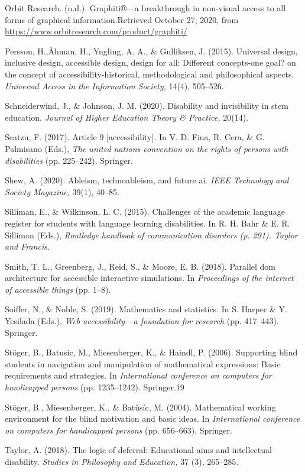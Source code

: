 \documentclass{sig-alternate} %
\begin{document}
Orbit Research. (n.d.). Graphiti®—a breakthrough in non-visual access to all forms of graphical information.Retrieved October 27, 2020, from \url{https://www.orbitresearch.com/product/graphiti/}

Persson, H.,Åhman, H., Yngling, A. A., \& Gulliksen, J. (2015). Universal design, inclusive design, accessible design, design for all: Different concepts-one goal? on the concept of accessibility-historical, methodological and philosophical aspects. \textit{Universal Access in the Information Society,} 14(4), 505–526.

Schneiderwind, J., \& Johnson, J. M. (2020). Disability and invisibility in stem education. \textit{Journal of Higher Education Theory \& Practice,} 20(14).

Seatzu, F. (2017). Article 9 [accessibility]. In V. D. Fina, R. Cera, \& G. Palmisano (Eds.), \textit{The united nations convention on the rights of persons with disabilities} (pp. 225–242). Springer.

Shew, A. (2020). Ableism, technoableism, and future ai. \textit{IEEE Technology and Society Magazine,} 39(1), 40–85.

Silliman, E., \& Wilkinson, L. C. (2015). Challenges of the academic language register for students with language learning disabilities. In R. H. Bahr \& E. R. Silliman (Eds.), \textit{Routledge handbook of communication disorders (p. 291). Taylor and Francis.}

Smith, T. L., Greenberg, J., Reid, S., \& Moore, E. B. (2018). Parallel dom architecture for accessible interactive simulations. In \textit{Proceedings of the internet of accessible things} (pp. 1–8).

Soiffer, N., \& Noble, S. (2019). Mathematics and statistics. In S. Harper \& Y. Yesilada (Eds.), \textit{Web accessibility—a foundation for research} (pp. 417–443). Springer.

Stöger, B., Batusic, M., Miesenberger, K., \& Haindl, P. (2006). Supporting blind students in navigation and manipulation of mathematical expressions: Basic requirements and strategies. In \textit{International conference on computers for handicapped persons} (pp. 1235–1242). Springer.19

Stöger, B., Miesenberger, K., \& Batǔsíc, M. (2004). Mathematical working environment for the blind motivation and basic ideas. In \textit{International conference on computers for handicapped persons} (pp. 656–663). Springer. %

Taylor, A. (2018). The logic of deferral: Educational aims and intellectual disability. \textit{Studies in Philosophy and Education,} 37 (3), 265–285.
\end{document}
